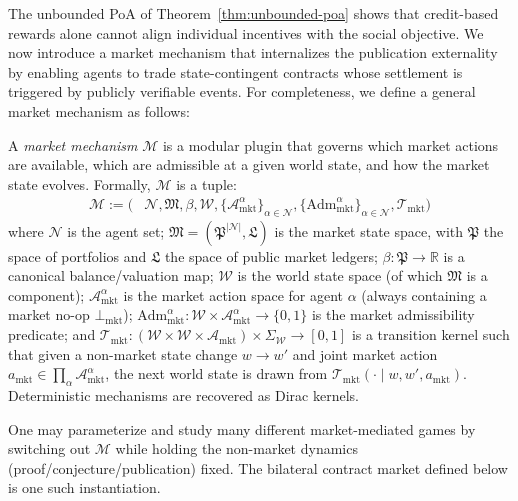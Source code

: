 The unbounded PoA of Theorem~\ref{thm:unbounded-poa} shows that credit-based rewards alone cannot align individual incentives with the social objective. We now introduce a market mechanism that internalizes the publication externality by enabling agents to trade state-contingent contracts whose settlement is triggered by publicly verifiable events. For completeness, we define a general market mechanism as follows:



\begin{definition}\label{def:market-mechanism}
A \emph{market mechanism} $\mathscr{M}$ is a modular plugin that governs which market actions are available, which are admissible at a given world state, and how the market state evolves. Formally, $\mathscr{M}$ is a tuple:
\begin{align*}
\mathscr{M} :=\Big(&\mathcal{N}, \mathfrak{M},\beta, \mathcal{W},\{\mathcal{A}^\alpha_{\mathrm{mkt}}\}_{\alpha\in\mathcal{N}},
\{\mathrm{Adm}^\alpha_{\mathrm{mkt}}\}_{\alpha\in\mathcal{N}},\mathcal{T}_{\mathrm{mkt}}\Big)
\end{align*}
where $\mathcal{N}$ is the agent set; $\mathfrak{M} = (\mathfrak{P}^{|\mathcal{N}|}, \mathfrak{L})$ is the market state space, with $\mathfrak{P}$ the space of portfolios and $\mathfrak{L}$ the space of public market ledgers; $\beta:\mathfrak{P}\to\mathbb{R}$ is a canonical balance/valuation map; $\mathcal{W}$ is the world state space (of which $\mathfrak{M}$ is a component); $\mathcal{A}^\alpha_{\mathrm{mkt}}$ is the market action space for agent $\alpha$ (always containing a market no-op $\bot_{\mathrm{mkt}}$); $\mathrm{Adm}^\alpha_{\mathrm{mkt}}:\mathcal{W}\times\mathcal{A}^\alpha_{\mathrm{mkt}}\to\{0,1\}$ is the market admissibility predicate; and $\mathcal{T}_{\mathrm{mkt}}:(\mathcal{W}\times\mathcal{W}\times\mathcal{A}_{\mathrm{mkt}})\times\Sigma_{\mathcal{W}}\to[0,1]$ is a transition kernel such that given a non-market state change $w\to w'$ and joint market action $a_{\mathrm{mkt}}\in\prod_\alpha\mathcal{A}^\alpha_{\mathrm{mkt}}$, the next world state is drawn from $\mathcal{T}_{\mathrm{mkt}}(\cdot\mid w,w',a_{\mathrm{mkt}})$. Deterministic mechanisms are recovered as Dirac kernels.
 
\end{definition}

One may parameterize and study many different market-mediated games by switching out $\mathscr{M}$ while holding the non-market dynamics (proof/conjecture/publication) fixed. The bilateral contract market defined below is one such instantiation.


